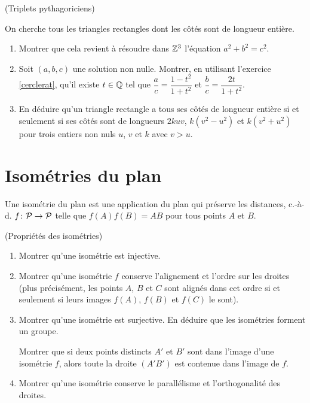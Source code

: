 \documentclass[a4paper,11pt,reqno]{amsart}
\begin{document}
\begin{exo} (Triplets pythagoriciens)

  On cherche tous les triangles rectangles dont les côtés sont de longueur entière.
  \begin{enumerate}
    \item Montrer que cela revient à résoudre dans $\mathbb{Z}^3$ l'équation $a^2+b^2=c^2$.
    \item Soit $(a,b,c)$ une solution non nulle. Montrer, en utilisant l'exercice \ref{cerclerat}, qu'il  existe $t \in \mathbb{Q}$ tel que $\dfrac{a}{c}= \dfrac{1-t^2}{1+t^2}$\; et\; $\dfrac{b}{c}= \dfrac{2t}{1+t^2}$.
    \item En déduire qu'un triangle rectangle a tous ses côtés de longueur entière si et seulement si ses côtés sont de longueurs $2kuv$, $k(v^2-u^2)$ et $k(v^2+u^2)$ pour trois entiers non nuls $u$, $v$ et $k$ avec $v>u$.
  \end{enumerate}
\end{exo}


\section{Isométries du plan}

\begin{convention}
  Une isométrie du plan est une application du plan qui préserve les distances, c.-à-d. $f \colon \mathcal{P} \to \mathcal{P}$ telle que $f(A)f(B)=AB$ pour tous points $A$ et $B$.
\end{convention}

\begin{exo} (Propriétés des isométries)

\begin{enumerate}
  \item Montrer qu'une isométrie est injective.
  \item Montrer qu'une isométrie $f$ conserve l'alignement et l'ordre sur les droites (plus précisément, les points $A$, $B$ et $C$ sont alignés dans cet ordre si et seulement si leurs images $f(A)$, $f(B)$ et $f(C)$ le sont).
  \item Montrer qu'une isométrie est surjective. En déduire que les isométries forment un groupe.\\
    \begin{indication}
      Montrer que si deux points distincts $A'$ et $B'$ sont dans l'image d'une isométrie $f$, alors toute la droite $(A'B')$ est contenue dans l'image de $f$.
    \end{indication}
  \item Montrer qu'une isométrie conserve le parallélisme et l'orthogonalité des droites.
\end{enumerate}
\end{exo}
\end{document}
